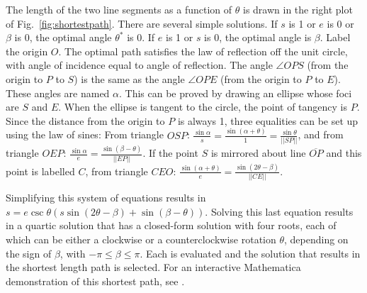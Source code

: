  
 The length of the two line segments as a function of $\theta$ is drawn in the right plot of Fig.~\ref{fig:shortestpath}. There are several simple solutions. If $s$ is 1 or $e$ is 0 or $\beta$ is 0, the optimal angle $\theta^*$ is 0. If $e$ is 1 or $s$ is 0, the optimal angle is $\beta$. Label the origin $O$. 
 The optimal path satisfies the law of reflection off the unit circle, with angle of incidence equal to angle of reflection.
 The angle $\angle{OPS}$ (from the origin to $P$ to $S$) is the same as the angle $\angle{OPE}$ (from the origin to $P$ to $E$). 
 These angles are named $\alpha$. This can be proved by drawing an ellipse whose foci are $S$ and $E$. When the ellipse is tangent to the circle, the point of tangency is $P$. 
  Since the distance from the origin to $P$ is always 1, three equalities can be set up using the law of sines:
 From triangle $OSP$: $\frac{\sin \alpha}{s}=\frac{\sin(\alpha + \theta)}{1}=\frac{\sin \theta}{||SP||}$, and from triangle $OEP$: $\frac{\sin \alpha}{e}=\frac{\sin(\beta - \theta)}{||EP||}$. If the point $S$ is mirrored about line $\overline{OP}$ and this point is labelled $C$, from triangle $CEO$: $\frac{\sin(\alpha + \theta)}{e}=\frac{\sin(2 \theta - \beta)}{||CE||}$.
 
 Simplifying this system of equations results in $s=e \csc \theta (s \sin(2 \theta-\beta)+\sin(\beta-\theta))$. Solving this last equation results in a quartic solution that has a closed-form solution with four roots, each of which can be either a clockwise or a counterclockwise rotation $\theta$, depending on the sign of $\beta$, with $-\pi\leq\beta\leq\pi$. Each is evaluated and the solution that results in the shortest length path is selected. %
 For an interactive Mathematica demonstration of this shortest path, see \cite{BeckerShortestPath}. 
 


